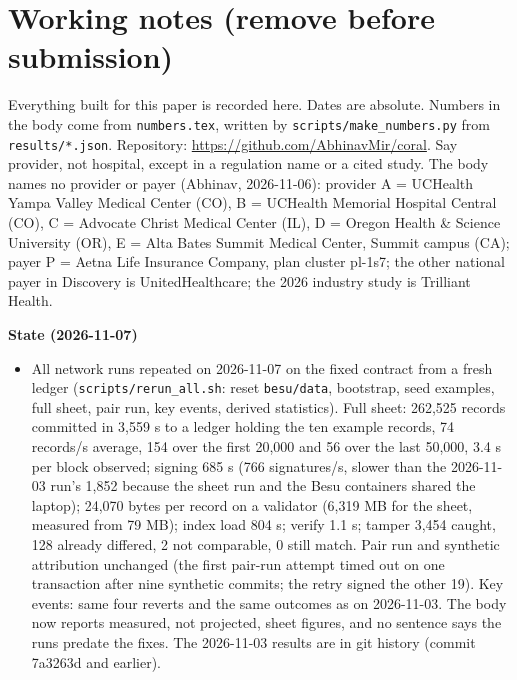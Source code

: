 \section*{Working notes (remove before submission)}

Everything built for this paper is recorded here. Dates are absolute. Numbers in the body come from \texttt{numbers.tex}, written by \texttt{scripts/make\_numbers.py} from \texttt{results/*.json}. Repository: \url{https://github.com/AbhinavMir/coral}. Say provider, not hospital, except in a regulation name or a cited study. The body names no provider or payer (Abhinav, 2026-11-06): provider A = UCHealth Yampa Valley Medical Center (CO), B = UCHealth Memorial Hospital Central (CO), C = Advocate Christ Medical Center (IL), D = Oregon Health \& Science University (OR), E = Alta Bates Summit Medical Center, Summit campus (CA); payer P = Aetna Life Insurance Company, plan cluster pl-1s7; the other national payer in Discovery is UnitedHealthcare; the 2026 industry study is Trilliant Health.

\textbf{State (2026-11-07)}
\begin{itemize}
\item All network runs repeated on 2026-11-07 on the fixed contract from a fresh ledger (\texttt{scripts/rerun\_all.sh}: reset \texttt{besu/data}, bootstrap, seed examples, full sheet, pair run, key events, derived statistics). Full sheet: 262,525 records committed in 3,559 s to a ledger holding the ten example records, 74 records/s average, 154 over the first 20,000 and 56 over the last 50,000, 3.4 s per block observed; signing 685 s (766 signatures/s, slower than the 2026-11-03 run's 1,852 because the sheet run and the Besu containers shared the laptop); 24,070 bytes per record on a validator (6,319 MB for the sheet, measured from 79 MB); index load 804 s; verify 1.1 s; tamper 3,454 caught, 128 already differed, 2 not comparable, 0 still match. Pair run and synthetic attribution unchanged (the first pair-run attempt timed out on one transaction after nine synthetic commits; the retry signed the other 19). Key events: same four reverts and the same outcomes as on 2026-11-03. The body now reports measured, not projected, sheet figures, and no sentence says the runs predate the fixes. The 2026-11-03 results are in git history (commit 7a3263d and earlier).
\end{itemize}


